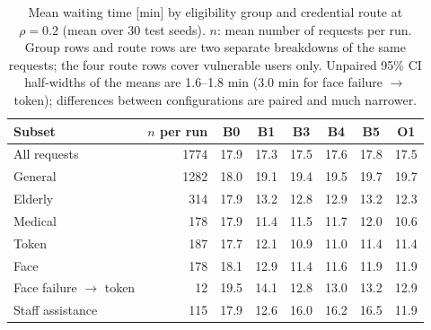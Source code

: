 \begin{table}[!t]
\caption{Mean waiting time [min] by eligibility group and credential route at $\rho=0.2$ (mean over 30 test seeds). $n$: mean number of requests per run. Group rows and route rows are two separate breakdowns of the same requests; the four route rows cover vulnerable users only. Unpaired 95\% CI half-widths of the means are 1.6--1.8 min (3.0 min for face failure $\rightarrow$ token); differences between configurations are paired and much narrower.}
\label{tabgrp}
\centering\footnotesize
\begin{tabular}{lrcccccc}
\toprule
Subset & $n$ per run & B0 & B1 & B3 & B4 & B5 & O1 \\
\midrule
All requests & 1774 & 17.9 & 17.3 & 17.5 & 17.6 & 17.8 & 17.5 \\
\midrule
General & 1282 & 18.0 & 19.1 & 19.4 & 19.5 & 19.7 & 19.7 \\
Elderly & 314 & 17.9 & 13.2 & 12.8 & 12.9 & 13.2 & 12.3 \\
Medical & 178 & 17.9 & 11.4 & 11.5 & 11.7 & 12.0 & 10.6 \\
\midrule
Token & 187 & 17.7 & 12.1 & 10.9 & 11.0 & 11.4 & 11.4 \\
Face & 178 & 18.1 & 12.9 & 11.4 & 11.6 & 11.9 & 11.9 \\
Face failure $\rightarrow$ token & 12 & 19.5 & 14.1 & 12.8 & 13.0 & 13.2 & 12.9 \\
Staff assistance & 115 & 17.9 & 12.6 & 16.0 & 16.2 & 16.5 & 11.9 \\
\bottomrule
\end{tabular}
\end{table}
